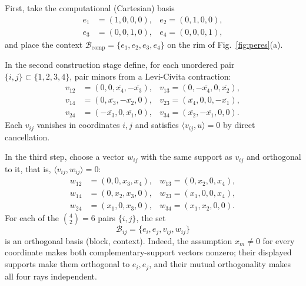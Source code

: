\documentclass[%
  reprint,
  superscriptaddress,
  showpacs,
  showkeys,
  amsmath,amssymb,
  pra,
  longbibliography,
  floatfix,
  x11names
]{revtex4-2}
\newcommand{\rev}[1]{{\color{revisionblue}#1}}
\begin{document}
\rev{First, take the computational (Cartesian) basis}
\begin{align*}
e_1&=(1,0,0,0), &
e_2 =(0,1,0,0),\\
e_3&=(0,0,1,0), &
e_4 =(0,0,0,1),
\end{align*}
\rev{and place the context $\mathcal{B}_{\mathrm{comp}}=\{e_1,e_2,e_3,e_4\}$ on the rim of Fig.~\ref{fig:peres}(a).}

In the second construction stage define, for each unordered pair $\{i,j\}\subset\{1,2,3,4\}$, pair minors from a Levi-Civita contraction:
\begin{align*}
v_{12} &= (0,0,\overline{x_4},-\overline{x_3}), &
v_{13}  = (0,-\overline{x_4},0,\overline{x_2}), \\
v_{14} &= (0,\overline{x_3},-\overline{x_2},0), &
v_{23}  = (\overline{x_4},0,0,-\overline{x_1}), \\
v_{24} &= (-\overline{x_3},0,\overline{x_1},0), &
v_{34}  = (\overline{x_2},-\overline{x_1},0,0).
\end{align*}
Each $v_{ij}$ vanishes in coordinates $i,j$ and satisfies $\langle v_{ij},u\rangle=0$ by direct cancellation.

In the third step, choose a vector $w_{ij}$ with the same support as $v_{ij}$ and orthogonal to it, that is, $\langle v_{ij},w_{ij}\rangle=0$:
\begin{align*}
w_{12}&=(0,0,x_3,x_4), &
w_{13} =(0,x_2,0,x_4), \\
w_{14}&=(0,x_2,x_3,0), &
w_{23} =(x_1,0,0,x_4), \\
w_{24}&=(x_1,0,x_3,0), &
w_{34} =(x_1,x_2,0,0).
\end{align*}
\rev{For each of the $\binom{4}{2}=6$ pairs $\{i,j\}$, the set}
\[
\mathcal{B}_{ij}=\{e_i, e_j, v_{ij}, w_{ij}\}
\]
is an orthogonal basis (block, context).  \rev{Indeed, the assumption $x_m\ne0$ for every coordinate makes both complementary-support vectors nonzero; their displayed supports make them orthogonal to $e_i,e_j$, and their mutual orthogonality makes all four rays independent.}
\end{document}
